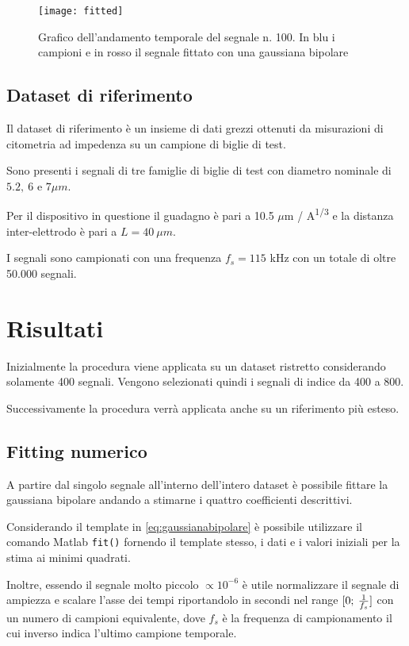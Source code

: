 \begin{figure}[t!]
	\centering
	\texttt{[image: fitted]}
	\caption{Grafico dell'andamento temporale del segnale n. 100. In blu i campioni e in rosso il segnale fittato con una gaussiana bipolare}
	\label{fig:fitted}
\end{figure}




\subsection{Dataset di riferimento}

Il dataset di riferimento è un insieme di dati grezzi ottenuti da misurazioni di citometria ad impedenza su un campione di biglie di test. 

Sono presenti i segnali di tre famiglie di biglie di test con diametro nominale di $5.2,\:6\text{ e }7 \mu m$. 

Per il dispositivo in questione il guadagno è pari a 10.5 $\mu$m / A\textsuperscript{1/3} e la distanza inter-elettrodo è pari a $L=40\: \mu m$. 

I segnali sono campionati con una frequenza $f_s=115$ kHz con un totale di oltre 50.000 segnali.



\section{Risultati}

Inizialmente la procedura viene applicata su un dataset ristretto considerando solamente 400 segnali. Vengono selezionati quindi i segnali di indice da 400 a 800.

Successivamente la procedura verrà applicata anche su un riferimento più esteso.

\subsection{Fitting numerico}

A partire dal singolo segnale all'interno dell'intero dataset è possibile fittare la gaussiana bipolare andando a stimarne i quattro coefficienti descrittivi.

Considerando il template in \cref{eq:gaussianabipolare} è possibile utilizzare il comando Matlab \texttt{fit()} fornendo il template stesso, i dati e i valori iniziali per la stima ai minimi quadrati.

Inoltre, essendo il segnale molto piccolo $\propto 10^{-6}$ è utile normalizzare il segnale di ampiezza e scalare l'asse dei tempi riportandolo in secondi nel range $[0;\:{1\over f_s}]$ con un numero di campioni equivalente, dove $f_s$ è la frequenza di campionamento il cui inverso indica l'ultimo campione temporale.


